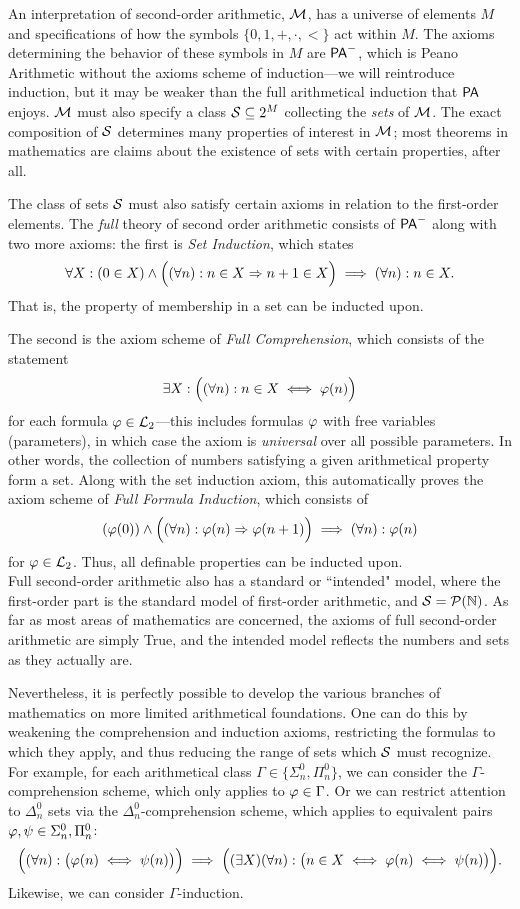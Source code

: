 \documentclass{amsart}
\begin{document}
	An interpretation of second-order arithmetic, $\mathcal{M}$, has a universe of elements $M$ and specifications of how the symbols $\{0,1,+,\cdot,<\}$ act within $M$. The axioms determining the behavior of these symbols in $M$ are $\sf{PA}^-$, which is Peano Arithmetic without the axioms scheme of induction---we will reintroduce induction, but it may be weaker than the full arithmetical induction that $\sf{PA}$ enjoys. $\mathcal{M}$ must also specify a class $\mathcal{S}\subseteq 2^M$ collecting the \textit{sets} of $\mathcal{M}$. The exact composition of $\mathcal{S}$ determines many properties of interest in $\mathcal{M}$; most theorems in mathematics are claims about the existence of sets with certain properties, after all. 
	
	The class of sets $\mathcal{S}$ must also satisfy certain axioms in relation to the first-order elements. The \textit{full} theory of second order arithmetic consists of $\sf{PA}^-$ along with two more axioms: the first is \textit{Set Induction}, which states
	$$
	\forall X: (0\in X) \wedge \Big((\forall n): n\in X \Rightarrow n+1\in X\Big) \implies (\forall n): n\in X.
	$$
	That is, the property of membership in a set can be inducted upon. 
	
	The second is the axiom scheme of \textit{Full Comprehension}, which consists of the statement
	$$
	\exists X: \Big((\forall n): n\in X \iff \varphi(n)\Big)
	$$
	for each formula $\varphi\in \mathcal{L}_2$---this includes formulas $\varphi$ with free variables (parameters), in which case the axiom is \textit{universal} over all possible parameters. In other words, the collection of numbers satisfying a given arithmetical property form a set. Along with the set induction axiom, this automatically proves the axiom scheme of \textit{Full Formula Induction}, which consists of 
	$$
	(\varphi(0)) \wedge \Big((\forall n): \varphi(n) \Rightarrow \varphi(n+1)\Big) \implies (\forall n): \varphi(n)
	$$
	for $\varphi\in \mathcal{L}_2$. Thus, all definable properties can be inducted upon.\\
	
	Full second-order arithmetic also has a standard or ``intended" model, where the first-order part is the standard model of first-order arithmetic, and $\mathcal{S} = \mathcal{P}(\mathbb{N})$. As far as most areas of mathematics are concerned, the axioms of full second-order arithmetic are simply True, and the intended model reflects the numbers and sets as they actually are. 
	
	Nevertheless, it is perfectly possible to develop the various branches of mathematics on more limited arithmetical foundations. One can do this by weakening the comprehension and induction axioms, restricting the formulas to which they apply, and thus reducing the range of sets which $\mathcal{S}$ must recognize. For example, for each arithmetical class $\Gamma \in \{\Sigma_n^0,\Pi_n^0\}$, we can consider the $\Gamma$-comprehension scheme, which only applies to $\varphi\in \Gamma$. Or we can restrict attention to $\Delta_n^0$ sets via the $\Delta_n^0$-comprehension scheme, which applies to equivalent pairs $\varphi,\psi \in \Sigma_n^0,\Pi_n^0$:
	$$
	\Big((\forall n):\big(\varphi(n) \iff \psi(n)\big)\Big) \implies \Big((\exists X) (\forall n): \big(n\in X \iff \varphi(n) \iff \psi(n)\big)\Big).
	$$
	Likewise, we can consider $\Gamma$-induction.\\
	
\end{document}
